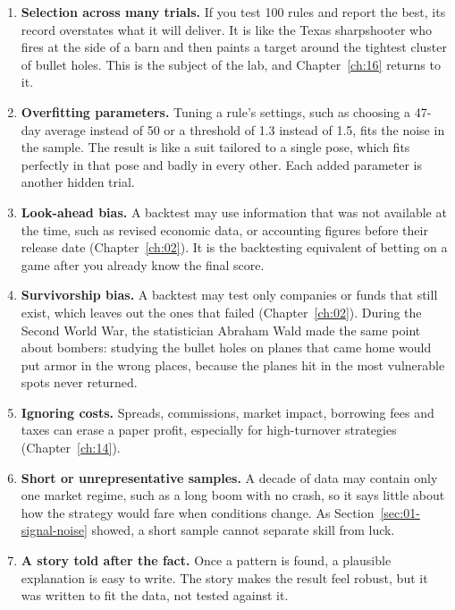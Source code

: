 \begin{enumerate}
  \item \textbf{Selection across many trials.} If you test 100 rules and report the best, its record overstates what it will deliver. It is like the Texas sharpshooter who fires at the side of a barn and then paints a target around the tightest cluster of bullet holes. This is the subject of the lab, and Chapter~\ref{ch:16} returns to it.
  \item \textbf{Overfitting parameters.} Tuning a rule's settings, such as choosing a 47-day average instead of 50 or a threshold of 1.3 instead of 1.5, fits the noise in the sample. The result is like a suit tailored to a single pose, which fits perfectly in that pose and badly in every other. Each added parameter is another hidden trial.
  \item \textbf{Look-ahead bias.} A backtest may use information that was not available at the time, such as revised economic data, or accounting figures before their release date (Chapter~\ref{ch:02}). It is the backtesting equivalent of betting on a game after you already know the final score.
  \item \textbf{Survivorship bias.} A backtest may test only companies or funds that still exist, which leaves out the ones that failed (Chapter~\ref{ch:02}). During the Second World War, the statistician Abraham Wald made the same point about bombers: studying the bullet holes on planes that came home would put armor in the wrong places, because the planes hit in the most vulnerable spots never returned.
  \item \textbf{Ignoring costs.} Spreads, commissions, market impact, borrowing fees and taxes can erase a paper profit, especially for high-turnover strategies (Chapter~\ref{ch:14}).
  \item \textbf{Short or unrepresentative samples.} A decade of data may contain only one market regime, such as a long boom with no crash, so it says little about how the strategy would fare when conditions change. As Section~\ref{sec:01-signal-noise} showed, a short sample cannot separate skill from luck.
  \item \textbf{A story told after the fact.} Once a pattern is found, a plausible explanation is easy to write. The story makes the result feel robust, but it was written to fit the data, not tested against it.
\end{enumerate}

